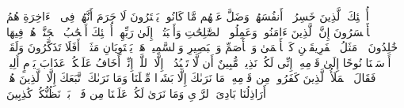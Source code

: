 \stopbuffer%
\startbuffer[\q:11:21]
أُو۟لَٰۤئِكَ ٱلَّذِینَ خَسِرُوۤا۟ أَنفُسَهُمۡ وَضَلَّ عَنۡهُم مَّا كَانُوا۟ یَفۡتَرُونَ%
\stopbuffer%
\startbuffer[\q:11:22]
لَا جَرَمَ أَنَّهُمۡ فِی ٱلۡءَاخِرَةِ هُمُ ٱلۡأَخۡسَرُونَ%
\stopbuffer%
\startbuffer[\q:11:23]
إِنَّ ٱلَّذِینَ ءَامَنُوا۟ وَعَمِلُوا۟ ٱلصَّٰلِحَٰتِ وَأَخۡبَتُوۤا۟ إِلَىٰ رَبِّهِمۡ أُو۟لَٰۤئِكَ أَصۡحَٰبُ ٱلۡجَنَّةِۖ هُمۡ فِیهَا خَٰلِدُونَ%
\stopbuffer%
\startbuffer[\q:11:24]
۞ مَثَلُ ٱلۡفَرِیقَیۡنِ كَٱلۡأَعۡمَىٰ وَٱلۡأَصَمِّ وَٱلۡبَصِیرِ وَٱلسَّمِیعِۚ هَلۡ یَسۡتَوِیَانِ مَثَلًاۚ أَفَلَا تَذَكَّرُونَ%
\stopbuffer%
\startbuffer[\q:11:25]
وَلَقَدۡ أَرۡسَلۡنَا نُوحًا إِلَىٰ قَوۡمِهِۦۤ إِنِّی لَكُمۡ نَذِیرࣱ مُّبِینٌ%
\stopbuffer%
\startbuffer[\q:11:26]
أَن لَّا تَعۡبُدُوۤا۟ إِلَّا ٱللَّهَۖ إِنِّیۤ أَخَافُ عَلَیۡكُمۡ عَذَابَ یَوۡمٍ أَلِیمࣲ%
\stopbuffer%
\startbuffer[\q:11:27]
فَقَالَ ٱلۡمَلَأُ ٱلَّذِینَ كَفَرُوا۟ مِن قَوۡمِهِۦ مَا نَرَىٰكَ إِلَّا بَشَرࣰا مِّثۡلَنَا وَمَا نَرَىٰكَ ٱتَّبَعَكَ إِلَّا ٱلَّذِینَ هُمۡ أَرَاذِلُنَا بَادِیَ ٱلرَّأۡیِ وَمَا نَرَىٰ لَكُمۡ عَلَیۡنَا مِن فَضۡلِۭ بَلۡ نَظُنُّكُمۡ كَٰذِبِینَ%
\stopbuffer%
